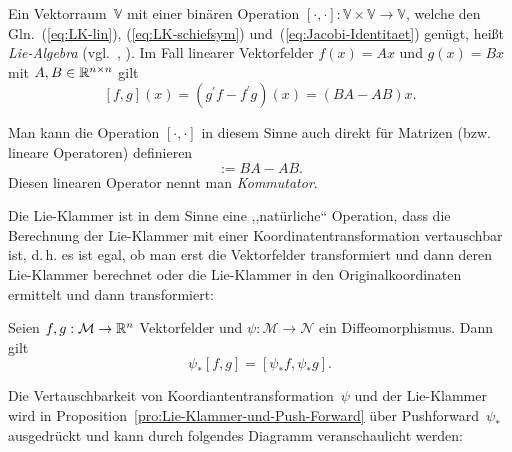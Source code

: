 \begin{remark}
\label{rem:Lie-Algebra}Ein Vektorraum~$\mathbb{V}$ mit einer binären
Operation $[\cdot,\cdot]:\mathbb{V}\times\mathbb{V}\to\mathbb{V}$,
welche den Gln.~(\ref{eq:LK-lin}), (\ref{eq:LK-schiefsym}) und~(\ref{eq:Jacobi-Identitaet})
genügt, heißt \emph{Lie-Algebra} (vgl.~\cite[Abschnitt~{39}]{arnold1989},
\cite{hilgert1991}). Im
Fall linearer Vektorfelder $f(x)=Ax$ und $g(x)=Bx$ mit $A,B\in{\mathbb{R}}^{n\times n}$
gilt 
\[
[f,g](x)=\left(g^{\prime}f-f^{\prime}g\right)(x)=\left(BA-AB\right)x.
\]

Man kann die Operation $[\cdot,\cdot]$ in diesem Sinne auch direkt
für Matrizen (bzw. lineare Operatoren) definieren 
\begin{equation}
[A,B]:=BA-AB.\label{eq:Kommutator}
\end{equation}
Diesen linearen Operator nennt man \emph{Kommutator}.

\medskip{}
\end{remark}

Die Lie-Klammer ist in dem Sinne eine ,,natürliche`` Operation,
dass die Berechnung der Lie-Klammer mit einer Koordinatentransformation
vertauschbar ist, d.\,h. es ist egal, ob man erst die Vektorfelder
transformiert und dann deren Lie-Klammer berechnet oder die Lie-Klammer
in den Originalkoordinaten ermittelt und dann transformiert:
\begin{proposition}
\label{pro:Lie-Klammer-und-Push-Forward}Seien $f,g:\mathcal{M}\to{\mathbb{R}}^{n}$
Vektorfelder und $\psi:\mathcal{M}\to\mathcal{N}$ ein Diffeomorphismus.
Dann gilt 
\begin{equation}
\psi_{*}[f,g]=[\psi_{*}f,\psi_{*}g].\label{eq:Push-forward-und-Lie-Klammer}
\end{equation}
\end{proposition}
Die Vertauschbarkeit von Koordiantentransformation~$\psi$ und der
Lie-Klammer wird in Proposition~\ref{pro:Lie-Klammer-und-Push-Forward}
über Pushforward~$\psi_{*}$ ausgedrückt und kann durch folgendes
Diagramm veranschaulicht werden:

